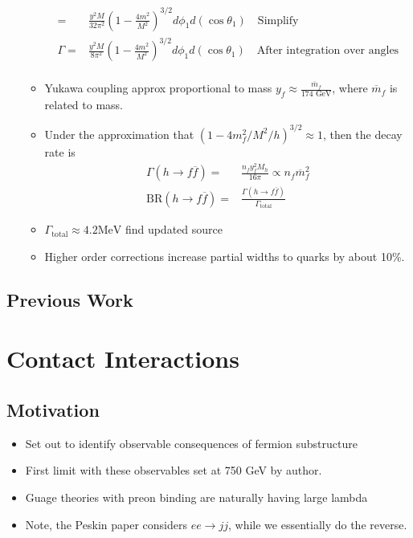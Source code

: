 \begin{itemize}
\begin{itemize}
\begin{equation}
\begin{split}
            =&\frac{y^2M}{32\pi^2}\left(1-\frac{4m^2}{M^2}\right)^{3/2}d\phi_1d(\cos\theta_1) \quad\text{Simplify}\\
            \Gamma=&\frac{y^2M}{8\pi^2}\left(1-\frac{4m^2}{M^2}\right)^{3/2}d\phi_1d(\cos\theta_1) \quad\text{After integration over angles}\\
        \end{split}\end{equation}
        \item Yukawa coupling approx proportional to mass $y_f\approx\frac{\overline{m}_f}{174\text{ GeV}}$, where $\overline{m}_f$ is related to mass. \cite{wells}
        \item Under the approximation that $(1-4m^2_f/M^2/h)^{3/2}\approx1$, then the decay rate is \cite{wells}
        \begin{equation}\begin{split}
        \Gamma(h\to f\overline{f})=&\frac{n_fy_f^2M_h}{16\pi}\propto n_f\overline{m}_f^2 \\
        \text{BR}(h\to f\overline{f})=&\frac{\Gamma(h\to f\overline{f})}{\Gamma_\text{total}}
        \end{split}\end{equation}
        \item $\Gamma_\text{total}\approx4.2\text{MeV}$ {\color{red} find updated source} \cite{wells}
        \item Higher order corrections increase partial widths to quarks by about 10\%. \cite{wells}
    \end{itemize}
\end{itemize}

\subsection{Previous Work}


\section{Contact Interactions}

\subsection{Motivation}
\begin{itemize}
    \item Set out to identify observable consequences of fermion substructure \cite{eichten}
    \item First limit with these observables set at 750 GeV by author. \cite{eichten}
    \item Guage theories with preon binding are naturally having large lambda  \cite{eichten}
    \item Note, the Peskin paper considers $ee\to jj$, while we essentially do the reverse. \cite{eichten}
\end{itemize}

